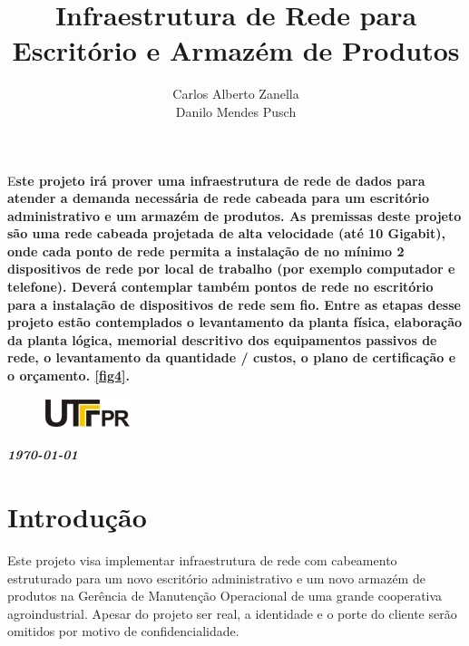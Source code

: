 \documentclass[	DIV=calc,%
							paper=a4,%
							fontsize=12pt,%
							onecolumn]{scrartcl}	 					%
\title{Infraestrutura de Rede para Escritório e Armazém de Produtos}					%
\author{Carlos Alberto Zanella \\ \vspace{0.3cm}Danilo Mendes Pusch}  	%
\date{}																				%
\newcommand{\initial}[1]{%
     \lettrine[lines=3,lhang=0.3,nindent=0em]{
     				\color{DarkGoldenrod}
     				{\textsf{#1}}}{}}
\begin{document}
\maketitle
\thispagestyle{fancy} 	
\thispagestyle{empty}		%





\initial{E}\textbf{ste projeto irá prover uma infraestrutura de rede de dados para atender a demanda necessária de rede cabeada para um escritório administrativo e um armazém de produtos. As premissas deste projeto são uma rede cabeada projetada de alta velocidade (até 10 Gigabit), onde cada ponto de rede permita a instalação de no mínimo 2 dispositivos de rede por local de trabalho (por exemplo computador e telefone). Deverá contemplar também pontos de rede no escritório para a instalação de dispositivos de rede sem fio. Entre as etapas desse projeto estão contemplados o levantamento da planta física, elaboração da planta lógica, memorial descritivo dos equipamentos passivos de rede, o levantamento da quantidade / custos, o plano de certificação e o orçamento.  \ref{fig4}.}


\begin{figure}
	\centering
	\includegraphics{utfpr}
\end{figure}

\vspace{2cm}
\centerline{\textit{\textbf{\today}}}

\clearpage
    \renewcommand*\listfigurename{Lista de figuras}
\listoffigures

\renewcommand*\listtablename{Lista de tabelas}
\listoftables




\clearpage
\renewcommand{\contentsname}{Sumário}
\tableofcontents
\clearpage

\section{Introdução}
Este projeto visa implementar infraestrutura de rede com cabeamento estruturado para um novo escritório administrativo e um novo armazém de produtos na Gerência de Manutenção Operacional de uma grande cooperativa agroindustrial. Apesar do projeto ser real, a identidade e o porte do cliente serão omitidos por motivo de confidencialidade. 
\end{document}
